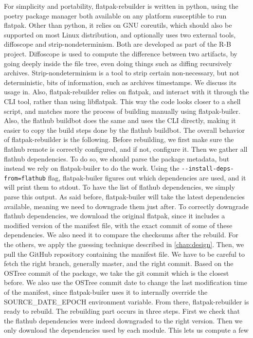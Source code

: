\documentclass[a4paper,11pt,oneside]{report}
\theoremstyle{definition}
\newcommand{\sysname}{flatpak-rebuilder\xspace}
\newcommand{\fp}{flatpak\xspace}
\newcommand{\fh}{flathub\xspace}
\newcommand{\fb}{flatpak-builer\xspace}
\newcommand{\sde}{SOURCE\_DATE\_EPOCH\xspace}
\newcommand{\fhbb}{flathub buildbot\xspace}
\begin{document}
For simplicity and portability, \sysname is written in python, using the poetry
package manager both available on any platform susceptible to run \fp. Other
than python, it relies on GNU coreutils, which should also be supported on most
Linux distribution, and optionally uses two external tools, diffoscope and
strip-nondeterminism. Both are developed as part of the R-B project. Diffoscope
is used to compute the difference between two artifacts, by going deeply inside
the file tree, even doing things such as diffing recursively archives.
Strip-nondeterminism is a tool to strip certain non-necessary, but not
deterministic, bits of information, such as archives timestamps. We discuss its
usage in. Also, \sysname relies on \fp, and interact with it through the CLI
tool, rather than using libflatpak. This way the code looks closer to a shell
script, and matches more the process of building manually using \fb. Also, the
\fhbb does the same and uses the CLI directly, making it easier to copy the
build steps done by the \fhbb. The overall behavior of \sysname is the
following. Before rebuilding, we first make sure the \fh remote is correctly
configured, and if not, configure it. Then we gather all \fh dependencies. To
do so, we should parse the package metadata, but instead we rely on \fb to do
the work. Using the \verb|--install-deps-from=flathub| flag, \fb figures out
which dependencies are used, and it will print them to stdout. To have the list
of \fh dependencies, we simply parse this output. As said before, \fb will take
the latest dependencies available, meaning we need to downgrade them just
after. To correctly downgrade \fh dependencies, we download the original \fp,
since it includes a modified version of the manifest file, with the exact
commit of some of these dependencies. We also need it to compare the checksums
after the rebuild. For the others, we apply the guessing technique described in
\autoref{chap:design}. Then, we pull the GitHub repository containing the
manifest file. We have to be careful to fetch the right branch, generally
master, and the right commit. Based on the OSTree commit of the package, we
take the git commit which is the closest before. We also use the OSTree commit
date to change the last modification time of the manifest, since \fb uses it to
internally override the \sde environment variable. From there, \sysname is
ready to rebuild. The rebuilding part occurs in three steps. First we check
that the \fh dependencies were indeed downgraded to the right version. Then we
only download the dependencies used by each module. This lets us compute a few
\end{document}
